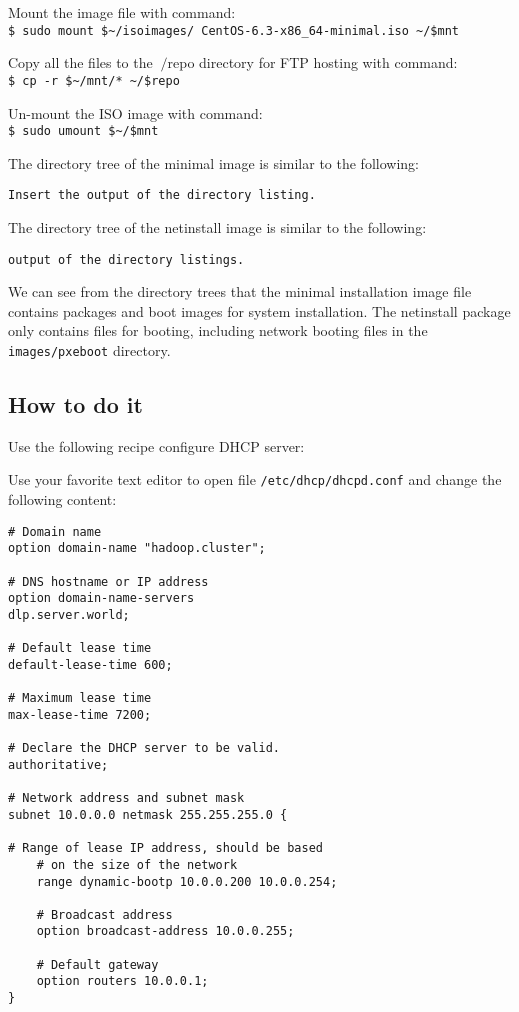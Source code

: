 Mount the image file with command: \\
\verb|$ sudo mount $~/isoimages/ CentOS-6.3-x86_64-minimal.iso ~/$mnt|

Copy all the files to the $~/$repo directory for FTP hosting with command: \\
\verb|$ cp -r $~/mnt/* ~/$repo|
    
Un-mount the ISO image with command: \\
\verb|$ sudo umount $~/$mnt|

The directory tree of the minimal image is similar to the following:
\begin{verbatim}
Insert the output of the directory listing.
\end{verbatim}

The directory tree of the netinstall image is similar to the following:
\begin{verbatim}
output of the directory listings. 
\end{verbatim}
We can see from the directory trees that the minimal installation image file contains packages and boot images for system installation. The netinstall package only contains files for booting, including network booting files in the \verb|images/pxeboot| directory.

\subsection*{How to do it}
Use the following recipe configure DHCP server:

Use your favorite text editor to open file \verb|/etc/dhcp/dhcpd.conf| and change the following content:
\begin{verbatim}
# Domain name
option domain-name "hadoop.cluster";

# DNS hostname or IP address
option domain-name-servers
dlp.server.world;

# Default lease time
default-lease-time 600;

# Maximum lease time
max-lease-time 7200;

# Declare the DHCP server to be valid.
authoritative;

# Network address and subnet mask
subnet 10.0.0.0 netmask 255.255.255.0 {

# Range of lease IP address, should be based
    # on the size of the network
    range dynamic-bootp 10.0.0.200 10.0.0.254;

    # Broadcast address
    option broadcast-address 10.0.0.255;

    # Default gateway
    option routers 10.0.0.1;
}
\end{verbatim}

